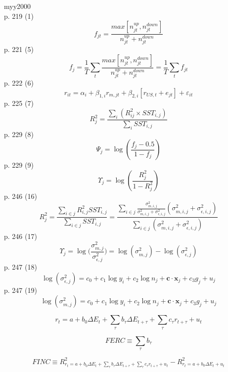 \documentclass{article}
\begin{document}
myy2000 \\
p. 219 (1)
$$ f_{jt} = \frac{max[n_{jt}^{up}, n_{jt}^{down}]}{n_{jt}^{up} + n^{down}_{jt}} $$
p. 221 (5)
$$ f_j = \frac{1}{T} 
    \displaystyle\sum_t \frac{max[n_{jt}^{up}, n_{jt}^{down}]}
    {n_{jt}^{up} + n_{jt}^{down}} = 
    \frac{1}{T} \displaystyle\sum_t f_{jt} $$
p. 222 (6)
$$ r_{it} = \alpha_i + \beta_{1,i} r_{m,jt} + 
    \beta_{2,i} [r_{US,t} + e_{jt}] + \varepsilon_{it} $$
p. 225 (7)
$$ R_j^2 = \frac{\sum_i (R_{ij}^2 \times SST_{i,j})}{\sum_i SST_{i,j}} $$
p. 229 (8)
$$ \Psi_j = \log(\frac{f_j - 0.5}{1 - f_j}) $$
p. 229 (9)
$$ \Upsilon_j = \log(\frac{R_j^2}{1 - R_j^2}) $$
p. 246 (16)
$$ R_j^2 = \frac{\sum_{i \in j} R_{i,j}^2 SST_{i,j}}{\sum_{i \in j}SST_{i,j}} =
    \frac{\sum_{i \in j} \frac{\sigma_{m,i,j}^2}{\sigma_{m,i,j}^2 + \sigma_{\epsilon,i,j}^2}
    (\sigma_{m,i,j}^2 + \sigma_{\epsilon,i,j}^2)}
    {\sum_{i \in j} (\sigma_{m,i,j}^2 + \sigma_{\epsilon,i,j}^2)} $$
p. 246 (17)
$$ \Upsilon_j = \log\bigg(\frac{\sigma_{m,j}^2}{\sigma_{\epsilon,j}^2}\bigg) =
    \log(\sigma_{m,j}^2) - \log(\sigma_{\epsilon, j}^2)$$
p. 247 (18)
$$ \log(\sigma_{\epsilon,j}^2) = c_0 + c_1 \log y_i + c_2 \log n_j +
    \boldsymbol{c} \cdot \boldsymbol{x}_j + c_3 g_j + u_j $$
p. 247 (19)
$$ \log(\sigma_{m,j}^2) = c_0 + c_1 \log y_i + c_2 \log n_j +
    \boldsymbol{c} \cdot \boldsymbol{x}_j + c_3 g_j + u_j $$


\begin{equation}
    r_t = a + b_0 \Delta E_t + 
    \sum_\tau b_\tau \Delta E_{t + \tau} + 
    \sum_\tau c_\tau r_{t + \tau} + u_t
\end{equation}

\begin{equation}
    FERC \equiv \sum_\tau b_\tau
\end{equation}

\begin{equation}
    FINC \equiv R_{r_t = a + b_0 \Delta E_t + 
    \sum_\tau b_\tau \Delta E_{t + \tau} + 
    \sum_\tau c_\tau r_{t + \tau} + u_t}^2 - 
    R_{r_t = a + b_0 \Delta E_t + u_t}^2
\end{equation}
\end{document}
